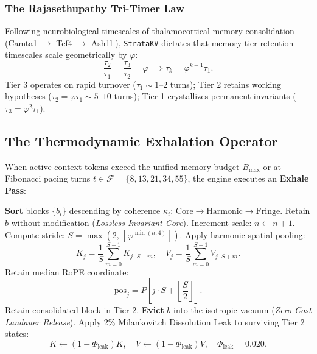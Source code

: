 \subsubsection{The Rajasethupathy Tri-Timer Law}
Following neurobiological timescales of thalamocortical memory consolidation (Camta1 $\to$ Tcf4 $\to$ Ash1l \cite{rajasethupathy2025, barteau2026phiphase}), \texttt{StrataKV} dictates that memory tier retention timescales scale geometrically by $\varphi$:
\begin{equation}
    \frac{\tau_2}{\tau_1} = \frac{\tau_3}{\tau_2} = \varphi \implies \tau_k = \varphi^{k-1} \tau_1.
\end{equation}
Tier 3 operates on rapid turnover ($\tau_1 \sim 1\text{--}2$ turns); Tier 2 retains working hypotheses ($\tau_2 = \varphi \tau_1 \sim 5\text{--}10$ turns); Tier 1 crystallizes permanent invariants ($\tau_3 = \varphi^2 \tau_1$).

\subsection{The Thermodynamic Exhalation Operator}

When active context tokens exceed the unified memory budget $B_{\text{max}}$ or at Fibonacci pacing turns $t \in \mathcal{F} = \{8, 13, 21, 34, 55\}$, the engine executes an \textbf{Exhale Pass}:

\begin{algorithm}[H]
\caption{The StrataKV Exhale Pass}
\begin{algorithmic}[1]
\STATE \textbf{Sort} blocks $\{b_i\}$ descending by coherence $\kappa_i$: $\text{Core} \to \text{Harmonic} \to \text{Fringe}$.
        \STATE Retain $b$ without modification (\textit{Lossless Invariant Core}).
            \STATE Increment scale: $n \leftarrow n + 1$.
            \STATE Compute stride: $S = \max\left(2, \, \left\lceil \varphi^{\min(n, 4)} \right\rceil \right)$.
            \STATE Apply harmonic spatial pooling:
            $$\bar{K}_j = \frac{1}{S}\sum_{m=0}^{S-1} K_{j \cdot S + m}, \quad \bar{V}_j = \frac{1}{S}\sum_{m=0}^{S-1} V_{j \cdot S + m}.$$
            \STATE Retain median RoPE coordinate:
            $$\text{pos}_j = P\left[ j \cdot S + \left\lfloor \frac{S}{2} \right\rfloor \right].$$
        \ENDIF
        \STATE Retain consolidated block in Tier 2.
    \ELSE
        \STATE \textbf{Evict} $b$ into the isotropic vacuum (\textit{Zero-Cost Landauer Release}).
    \ENDIF
\ENDFOR
\STATE Apply 2\% Milankovitch Dissolution Leak to surviving Tier 2 states:
$$K \leftarrow (1 - \Phi_{\text{leak}}) K, \quad V \leftarrow (1 - \Phi_{\text{leak}}) V, \quad \Phi_{\text{leak}} = 0.020.$$
\end{algorithmic}
\end{algorithm}


